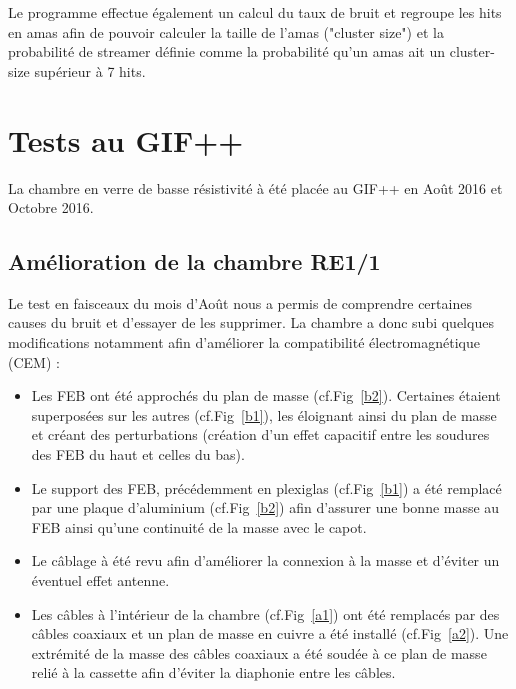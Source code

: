 Le programme effectue également un calcul du taux de bruit et regroupe les hits en amas afin de pouvoir calculer la taille de l'amas ("cluster size") et la probabilité de streamer définie comme la probabilité qu'un amas ait un cluster-size supérieur à 7 hits.

\section{Tests au GIF++}
\vspace{-0.3cm}
La chambre en verre de basse résistivité à été placée au GIF++ en Août 2016 et Octobre 2016.
\vspace{-0.3cm}
\subsection{Amélioration de la chambre RE1/1}
\vspace{-0.3cm}
Le test en faisceaux du mois d'Août nous a permis de comprendre certaines causes du bruit et d'essayer de les supprimer.
La chambre a donc subi quelques modifications notamment afin d'améliorer la compatibilité électromagnétique (CEM) \cite{charoy2012comp}:

\begin{itemize}[label=$\bullet$]
	\item Les FEB ont été approchés du plan de masse (cf.Fig~\ref{b2}). Certaines étaient superposées sur les autres (cf.Fig~\ref{b1}), les éloignant ainsi du plan de masse et créant des perturbations (création d'un effet capacitif entre les soudures des FEB du haut et celles du bas).
	\item Le support des FEB, précédemment en plexiglas (cf.Fig~\ref{b1}) a été remplacé par une plaque d'aluminium (cf.Fig~\ref{b2}) afin d'assurer une bonne masse au FEB ainsi qu'une continuité de la masse avec le capot.
	\item Le câblage à été revu afin d'améliorer la connexion à la masse et d'éviter un éventuel effet antenne.
	\item Les câbles à l'intérieur de la chambre (cf.Fig~\ref{a1}) ont été remplacés par des câbles coaxiaux et un plan de masse en cuivre a été installé (cf.Fig~\ref{a2}). Une extrémité de la masse des câbles coaxiaux a été soudée à ce plan de masse relié à la cassette afin d'éviter la diaphonie entre les câbles.
\end{itemize}


